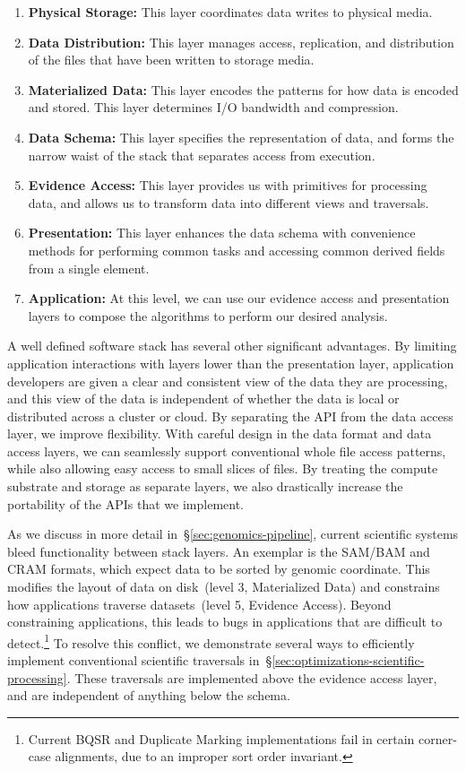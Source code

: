 \documentclass{acm_proc_article-sp}
\begin{document}
\begin{enumerate}
\item {\bf Physical Storage:} This layer coordinates data writes to physical media.
\item {\bf Data Distribution:} This layer manages access, replication, and distribution of the files that have
been written to storage media.
\item {\bf Materialized Data:} This layer encodes the patterns for how data is encoded and stored. This
layer determines I/O bandwidth and compression.
\item {\bf Data Schema:} This layer specifies the representation of data, and forms the narrow waist of
the stack that separates access from execution.
\item {\bf Evidence Access:} This layer provides us with primitives for processing data, and allows us to
transform data into different views and traversals.
\item {\bf Presentation:} This layer enhances the data schema with convenience methods for performing
common \linebreak tasks and accessing common derived fields from a single element.
\item {\bf Application:} At this level, we can use our evidence access and presentation layers to compose
the algorithms to perform our desired analysis.
\end{enumerate}

A well defined software stack has several other significant advantages. By limiting application
interactions with layers lower than the presentation layer, application developers are given a clear and
consistent view of the data they are processing, and this view of the data is independent of whether the
data is local or distributed across a cluster or cloud. By separating the API from the data access layer,
we improve flexibility. With careful design in the data format and data access layers, we can seamlessly
support conventional whole file access patterns, while also allowing easy access to small slices of files.
By treating the compute substrate and storage as separate layers, we also drastically increase
the portability of the APIs that we implement.

As we discuss in more detail in~\S\ref{sec:genomics-pipeline}, current scientific systems bleed
functionality between stack layers. An exemplar is the SAM/BAM and CRAM formats, which expect data
to be sorted by genomic coordinate. This modifies the layout of data on disk~(level 3, Materialized Data)
and constrains how applications traverse datasets~(level 5, Evidence Access). Beyond
constraining applications, this leads to bugs in applications that are difficult to detect.\footnote{Current BQSR and
Duplicate Marking implementations fail in certain corner-case alignments, due to an improper sort order invariant.}
To resolve this conflict, we demonstrate several ways to efficiently implement conventional scientific
traversals in~\S\ref{sec:optimizations-scientific-processing}. These traversals are implemented above the
evidence access layer, and are independent of anything below the schema.
\end{document}
